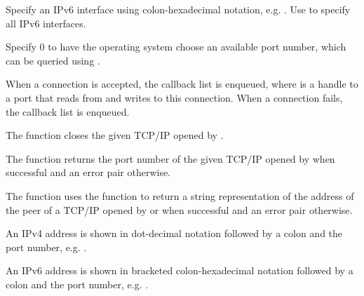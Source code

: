 Specify an IPv6 interface  using colon-hexadecimal
notation, e.g. . Use \code{::} to specify all IPv6
interfaces.

Specify  0 to have the operating system choose an available
port number, which can be queried using
.

When a connection is accepted, the callback list
 is enqueued, where  is a
handle to a port that reads from and writes to this connection. When a
connection fails, the callback list  is enqueued.

\begin{function}
\end{function}

The  function closes the given TCP/IP
 opened by .

\begin{function}
\end{function}

The  function returns the port
number of the given TCP/IP  opened by
 when successful and an error pair otherwise.

\begin{function}
\end{function}

The  function uses the
 function to return a string representation
of the address of the peer of a TCP/IP  opened by
 or  when successful
and an error pair otherwise.

An IPv4 address is shown in dot-decimal notation followed by a colon
and the port number, e.g. .

An IPv6 address is shown in bracketed colon-hexadecimal notation
followed by a colon and the port number, e.g. .

\begin{function}
\end{function}

